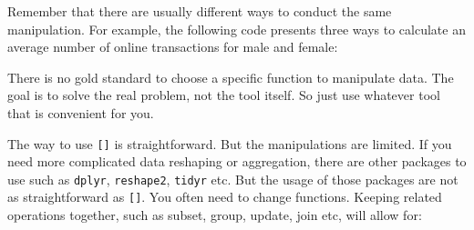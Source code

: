 \documentclass[12pt,]{krantz}
\makeatletter
\newenvironment{Shaded}{\begin{snugshade}}{\end{snugshade}}
\newcommand{\CommentTok}[1]{\textcolor[rgb]{0.37,0.37,0.37}{\textit{#1}}}
\newcommand{\DataTypeTok}[1]{\textcolor[rgb]{0.27,0.27,0.27}{#1}}
\newcommand{\DecValTok}[1]{\textcolor[rgb]{0.06,0.06,0.06}{#1}}
\newcommand{\KeywordTok}[1]{\textcolor[rgb]{0.27,0.27,0.27}{\textbf{#1}}}
\newcommand{\NormalTok}[1]{#1}
\newcommand{\OperatorTok}[1]{\textcolor[rgb]{0.43,0.43,0.43}{\textbf{#1}}}
\newcommand{\StringTok}[1]{\textcolor[rgb]{0.5,0.5,0.5}{#1}}
\newenvironment{kframe}{%
\medskip{}
\setlength{\fboxsep}{.8em}
 \def\at@end@of@kframe{}%
 \ifinner\ifhmode%
  \def\at@end@of@kframe{\end{minipage}}%
  \begin{minipage}{\columnwidth}%
 \fi\fi%
 \def\FrameCommand##1{\hskip\@totalleftmargin \hskip-\fboxsep
 \colorbox{shadecolor}{##1}\hskip-\fboxsep
     \hskip-\linewidth \hskip-\@totalleftmargin \hskip\columnwidth}%
 \MakeFramed {\advance\hsize-\width
   \@totalleftmargin\z@ \linewidth\hsize
   \@setminipage}}%
 {\par\unskip\endMakeFramed%
 \at@end@of@kframe}
\renewenvironment{Shaded}{\begin{kframe}}{\end{kframe}}
\makeatother
\begin{document}
\begin{Shaded}
\end{Shaded}

Remember that there are usually different ways to conduct the same manipulation. For example, the following code presents three ways to calculate an average number of online transactions for male and female:

\begin{Shaded}
\end{Shaded}

There is no gold standard to choose a specific function to manipulate data. The goal is to solve the real problem, not the tool itself. So just use whatever tool that is convenient for you.

The way to use \texttt{{[}{]}} is straightforward. But the manipulations are limited. If you need more complicated data reshaping or aggregation, there are other packages to use such as \texttt{dplyr}, \texttt{reshape2}, \texttt{tidyr} etc. But the usage of those packages are not as straightforward as \texttt{{[}{]}}. You often need to change functions. Keeping related operations together, such as subset, group, update, join etc, will allow for:
\end{document}
